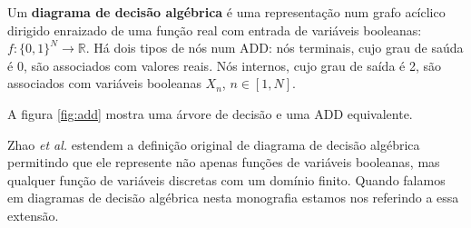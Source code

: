 \begin{definition}
  Um \textbf{diagrama de decisão algébrica} é uma representação num grafo acíclico dirigido enraizado de uma função real com entrada de variáveis booleanas: $f : \{0,1\}^N \rightarrow \mathbb{R}$. Há dois tipos de nós num ADD: nós terminais, cujo grau de saúda é 0, são associados com valores reais. Nós internos, cujo grau de saída é 2, são associados com variáveis booleanas $X_n$, $n \in [1, N]$.
\end{definition}

A figura \ref{fig:add} mostra uma árvore de decisão e uma ADD equivalente.

Zhao \emph{et al.} \cite{Zhao2015} estendem a definição original de diagrama de decisão algébrica permitindo que ele represente não apenas funções de variáveis booleanas, mas qualquer função de variáveis discretas com um domínio finito. Quando falamos em diagramas de decisão algébrica nesta monografia estamos nos referindo a essa extensão.

